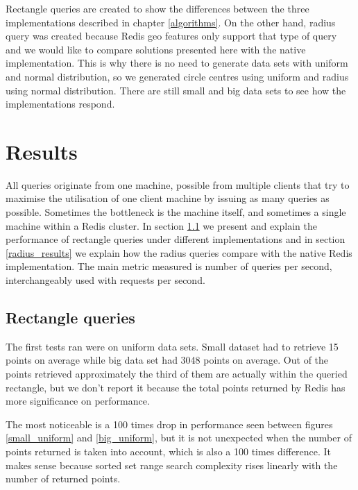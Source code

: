 \documentclass[times, utf8, diplomski]{fer}
\begin{document}
Rectangle queries are created to show the differences between the three implementations described in chapter \ref{algorithms}. On the other hand, radius query was created because Redis geo features only support that type of query and we would like to compare solutions presented here with the native implementation. This is why there is no need to generate data sets with uniform and normal distribution, so we generated circle centres using uniform and radius using normal distribution. There are still small and big data sets to see how the implementations respond.

\chapter {Results}
All queries originate from one machine, possible from multiple clients that try to maximise the utilisation of one client machine by issuing as many queries as possible. Sometimes the bottleneck is the machine itself, and sometimes a single machine within a Redis cluster. In section \ref{rectangle_results} we present and explain the performance of rectangle queries under different implementations and in section \ref{radius_results} we explain how the radius queries compare with the native Redis implementation. The main metric measured is number of queries per second, interchangeably used with requests per second.

\section {Rectangle queries} \label {rectangle_results}
The first tests ran were on uniform data sets. Small dataset had to retrieve 15 points on average while big data set had 3048 points on average. Out of the points retrieved approximately the third of them are actually within the queried rectangle, but we don't report it because the total points returned by Redis has more significance on performance. 

The most noticeable is a 100 times drop in performance seen between figures \ref{small_uniform} and \ref{big_uniform}, but it is not unexpected when the number of points returned is taken into account, which is also a 100 times difference. It makes sense because sorted set range search complexity rises linearly with the number of returned points.
\end{document}
